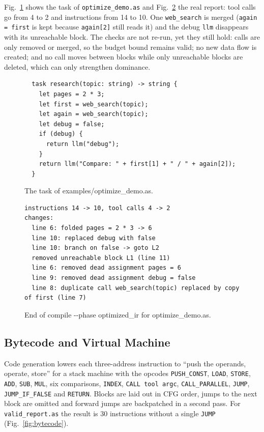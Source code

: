 \documentclass[conference]{IEEEtran}
\begin{document}
Fig.~\ref{fig:optsrc} shows the task of \texttt{optimize\_demo.as} and Fig.~\ref{fig:opt} the real report: tool calls go from 4 to 2 and instructions from 14 to 10. One \texttt{web\_search} is merged (\texttt{again = first} is kept because \texttt{again[2]} still reads it) and the debug \texttt{llm} disappears with its unreachable block. The checks are not re-run, yet they still hold: calls are only removed or merged, so the budget bound remains valid; no new data flow is created; and no call moves between blocks while only unreachable blocks are deleted, which can only strengthen dominance.

\begin{figure}[!htb]
\begin{lstlisting}
  task research(topic: string) -> string {
    let pages = 2 * 3;
    let first = web_search(topic);
    let again = web_search(topic);
    let debug = false;
    if (debug) {
      return llm("debug");
    }
    return llm("Compare: " + first[1] + " / " + again[2]);
  }
\end{lstlisting}
\caption{The task of examples/optimize\_demo.as.}
\label{fig:optsrc}
\end{figure}

\begin{figure}[!htb]
\begin{lstlisting}
instructions 14 -> 10, tool calls 4 -> 2
changes:
  line 6: folded pages = 2 * 3 -> 6
  line 10: replaced debug with false
  line 10: branch on false -> goto L2
  removed unreachable block L1 (line 11)
  line 6: removed dead assignment pages = 6
  line 9: removed dead assignment debug = false
  line 8: duplicate call web_search(topic) replaced by copy of first (line 7)
\end{lstlisting}
\caption{End of compile -{}-phase optimized\_ir for optimize\_demo.as.}
\label{fig:opt}
\end{figure}

\subsection{Bytecode and Virtual Machine}
Code generation lowers each three-address instruction to ``push the operands, operate, store'' for a stack machine with the opcodes \texttt{PUSH\_CONST}, \texttt{LOAD}, \texttt{STORE}, \texttt{ADD}, \texttt{SUB}, \texttt{MUL}, six comparisons, \texttt{INDEX}, \texttt{CALL tool argc}, \texttt{CALL\_PARALLEL}, \texttt{JUMP}, \texttt{JUMP\_IF\_FALSE} and \texttt{RETURN}. Blocks are laid out in CFG order, jumps to the next block are omitted and forward jumps are backpatched in a second pass. For \texttt{valid\_report.as} the result is 30 instructions without a single \texttt{JUMP} (Fig.~\ref{fig:bytecode}).
\end{document}
